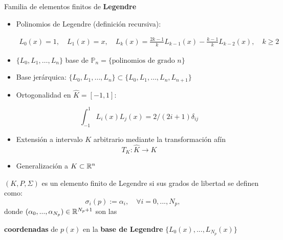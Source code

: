 \documentclass[10pt,leqno]{beamer}
\newcommand{\Np}{{N_p}}
\newcommand{\refelem}{\widehat}
\begin{document}
\begin{frame}{Familia de elementos finitos de \textbf{Legendre}}
  \small
  \begin{itemize}
  \item Polinomios de Legendre (definición recursiva):
    \begin{footnotesize}
      \begin{align*}
        L_0(x)=1, \quad L_1(x)=x,
        \quad L_{k}(x) = \frac{2k-1}k L_{k-1}(x) - \frac{k-1}{k} L_{k-2}(x), \quad k\ge 2
      \end{align*}
    \end{footnotesize}
  \item $\{L_0,L_1,\dots,L_n\}$ base de
    $\mathbb{P}_n=\{\text{polinomios de grado } n\}$
  \item \alert{Base jerárquica}:
    $\{L_0,L_1,\dots,L_n\} \subset \{L_0,L_1,\dots,L_n, L_{n+1}\}$
  \item \alert{Ortogonalidad} en $\refelem K=[-1,1]$:
    \begin{footnotesize}
      $$\int_{-1}^1 L_i(x) L_j(x) = 2/(2i+1)\delta_{ij}$$
    \end{footnotesize}
  \item Extensión a intervalo $K$ arbitrario mediante la transformación afín
    $$T_K : \refelem K \to K$$
  \item Generalización a $K\subset{\mathbb R}^n$~\cite{solin_higher-order_2004}
  \end{itemize}
  \vspace{-0.3em}
  \normalsize
  \begin{definition} $(K,P,\Sigma)$ es un \alert{elemento finito de
      Legendre} si sus grados de libertad se definen como:
    $$
    \sigma_i(p) := \alpha_i, \quad \forall i=0,...,\Np,
    $$
    donde $(\alpha_0,...,\alpha_\Np) \in\Rset^{\Np+1}$ son las
    \vspace{-0.3em}
    \begin{center}
      \textbf{coordenadas} de $p(x)$ en la \textbf{base de Legendre}
      $\{L_0(x),...,L_\Np(x)\}$
    \end{center}
  \end{definition}

\end{frame}
\end{document}
